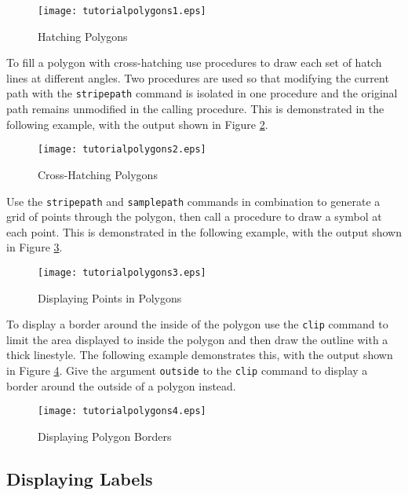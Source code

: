 

\begin{figure}[htb]
\texttt{[image: tutorialpolygons1.eps]}
\caption{Hatching Polygons}
\label{tutorialpolygons1}
\end{figure}

To fill a polygon with cross-hatching use procedures to
draw each set of hatch lines at different angles.  Two procedures
are used so that modifying the current path with the
\texttt{stripepath}
command is isolated in one procedure and the original path
remains unmodified in the calling procedure.
This is demonstrated in the following example, with the output
shown in Figure \ref{tutorialpolygons2}.



\begin{figure}[htb]
\texttt{[image: tutorialpolygons2.eps]}
\caption{Cross-Hatching Polygons}
\label{tutorialpolygons2}
\end{figure}

Use the \texttt{stripepath} and \texttt{samplepath}
commands in combination to generate a grid of points through the
polygon, then call a procedure to draw a symbol at each point.
This is demonstrated in the following example, with the output
shown in Figure \ref{tutorialpolygons3}.



\begin{figure}[htb]
\texttt{[image: tutorialpolygons3.eps]}
\caption{Displaying Points in Polygons}
\label{tutorialpolygons3}
\end{figure}

To display a border around the inside of the polygon
use the \texttt{clip}
command to limit the area displayed to inside the polygon
and then draw the outline with a thick linestyle.
The following example demonstrates this, with the output shown
in Figure \ref{tutorialpolygons4}.
Give the argument \texttt{outside}
to the \texttt{clip} command
to display a border around the outside of a polygon instead.



\begin{figure}[htb]
\texttt{[image: tutorialpolygons4.eps]}
\caption{Displaying Polygon Borders}
\label{tutorialpolygons4}
\end{figure}

\subsection{Displaying Labels}


